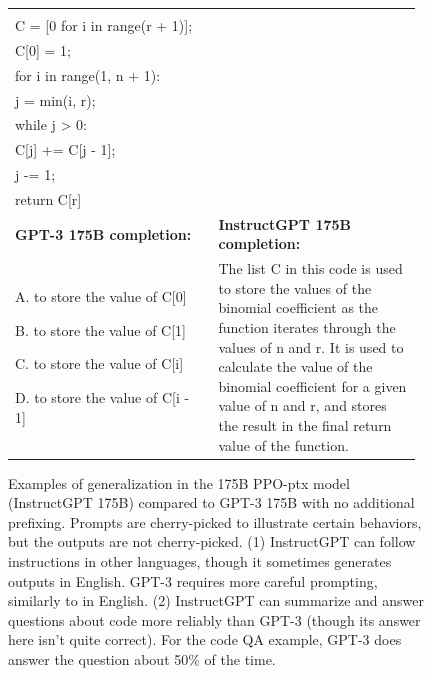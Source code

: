 \begin{figure}[tp]
\begin{tabular}{p{0.48\linewidth} p{0.48\linewidth}}
{\begin{minipage}{\linewidth}
        \vspace{5pt}\texttt{def binomial\_coefficient(n, r): \\
        \hspace*{2em} C = [0 for i in range(r + 1)]; \\
        \hspace*{2em} C[0] = 1; \\
        \hspace*{2em} for i in range(1, n + 1): \\
        \hspace*{2em} \hspace*{2em} j = min(i, r); \\
        \hspace*{2em} \hspace*{2em} while j > 0: \\
        \hspace*{2em} \hspace*{2em} \hspace*{2em} C[j] += C[j - 1]; \\
        \hspace*{2em} \hspace*{2em} \hspace*{2em} j -= 1; \\
        \hspace*{2em} return C[r]
        }
        \end{minipage}\vspace{5pt}
    } \\
    \midrule
    \textbf{GPT-3 175B completion:} & \textbf{InstructGPT 175B completion:} \\
        A. to store the value of C[0]

        B. to store the value of C[1]

        C. to store the value of C[i]

        D. to store the value of C[i - 1]
    &
        The list C in this code is used to store the values of the binomial coefficient as the function iterates through the values of n and r. It is used to calculate the value of the binomial coefficient for a given value of n and r, and stores the result in the final return value of the function.  \\
    \bottomrule
    \end{tabular}
    \caption{Examples of generalization in the 175B PPO-ptx model (InstructGPT 175B) compared to GPT-3 175B with no additional prefixing. Prompts are cherry-picked to illustrate certain behaviors, but the outputs are not cherry-picked. (1) InstructGPT can follow instructions in other languages, though it sometimes generates outputs in English. GPT-3 requires more careful prompting, similarly to in English. (2) InstructGPT can summarize and answer questions about code more reliably than GPT-3 (though its answer here isn't quite correct). For the code QA example, GPT-3 does answer the question about 50\% of the time.}
    \label{fig:qual_ex_1}
\end{figure}


